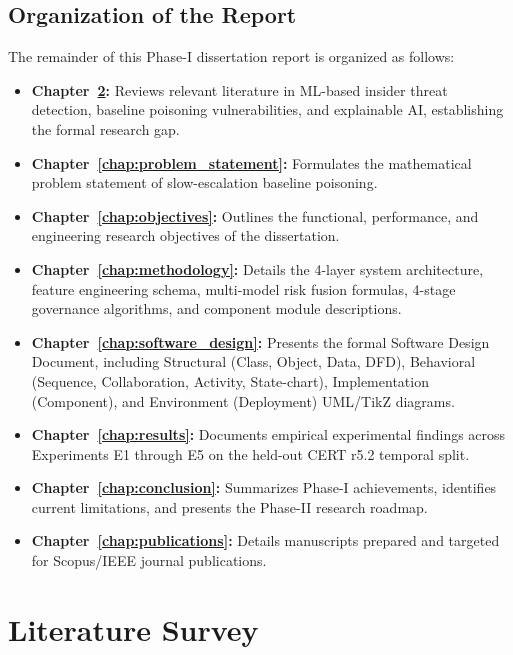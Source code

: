 \documentclass[12pt,a4paper]{report}
\begin{document}
\section{Organization of the Report}
The remainder of this Phase-I dissertation report is organized as follows:
\begin{itemize}
    \item \textbf{Chapter~\ref{chap:literature_survey}:} Reviews relevant literature in ML-based insider threat detection, baseline poisoning vulnerabilities, and explainable AI, establishing the formal research gap.
    \item \textbf{Chapter~\ref{chap:problem_statement}:} Formulates the mathematical problem statement of slow-escalation baseline poisoning.
    \item \textbf{Chapter~\ref{chap:objectives}:} Outlines the functional, performance, and engineering research objectives of the dissertation.
    \item \textbf{Chapter~\ref{chap:methodology}:} Details the 4-layer system architecture, feature engineering schema, multi-model risk fusion formulas, 4-stage governance algorithms, and component module descriptions.
    \item \textbf{Chapter~\ref{chap:software_design}:} Presents the formal Software Design Document, including Structural (Class, Object, Data, DFD), Behavioral (Sequence, Collaboration, Activity, State-chart), Implementation (Component), and Environment (Deployment) UML/TikZ diagrams.
    \item \textbf{Chapter~\ref{chap:results}:} Documents empirical experimental findings across Experiments E1 through E5 on the held-out CERT r5.2 temporal split.
    \item \textbf{Chapter~\ref{chap:conclusion}:} Summarizes Phase-I achievements, identifies current limitations, and presents the Phase-II research roadmap.
    \item \textbf{Chapter~\ref{chap:publications}:} Details manuscripts prepared and targeted for Scopus/IEEE journal publications.
\end{itemize}

\chapter{Literature Survey}
\label{chap:literature_survey}
\end{document}
